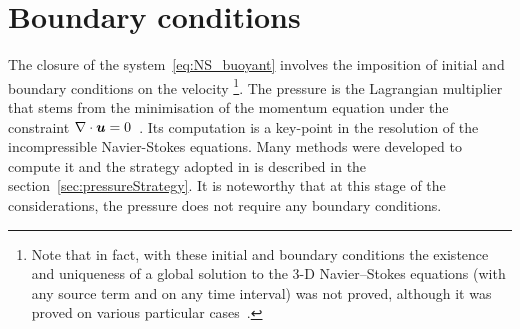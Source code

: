 

\section{Boundary conditions}
The closure of the system~\eqref{eq:NS_buoyant} involves the imposition of initial and boundary conditions on the velocity%
\footnote{Note that in fact, with these initial and boundary conditions the existence and uniqueness of a global solution
  to the 3-D Navier--Stokes equations (with any source term and on any time interval)
  was not proved, although it was proved on various particular cases~\cite{Lions1996}.}.
The pressure is the Lagrangian multiplier that stems from the minimisation of the momentum equation
under the constraint \mbox{$\nabla \cdot \bm{u} = 0$}~\cite{Aris1962}.
Its computation is a key-point in the resolution of the incompressible Navier-Stokes equations.
Many methods were developed to compute it and the strategy adopted in  is described in the
section~\ref{sec:pressureStrategy}.
It is noteworthy that at this stage of the considerations, the pressure does not require any boundary conditions.



